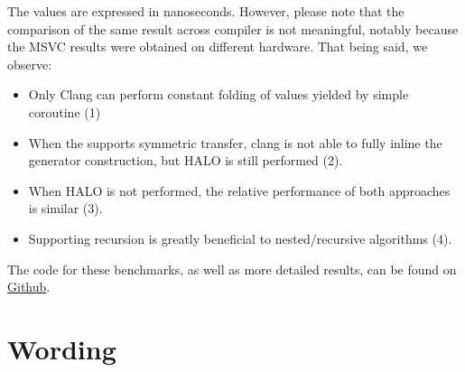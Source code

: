 \documentclass{wg21}
\begin{document}


The values are expressed in nanoseconds. However, please note that the comparison of the same result across compiler is not meaningful, notably because the MSVC results were obtained on different hardware.
That being said, we observe:

\begin{itemize}
    \item Only Clang can perform constant folding of values yielded by simple coroutine (1)
    \item When the  supports symmetric transfer, clang is not able to fully inline the generator construction, but HALO is still performed (2).
    \item When HALO is not performed, the relative performance of both approaches is similar (3).
    \item Supporting recursion is greatly beneficial to nested/recursive algorithms (4).
\end{itemize}

The code for these benchmarks, as well as more detailed results, can be found on \href{https://github.com/cor3ntin/coro_benchmark}{Github}.

\newpage
\section{Wording}

\end{document}
